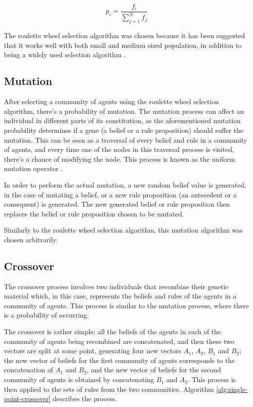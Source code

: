 \begin{equation}
  \label{eq:proportional-fitness}
  p_i = \frac{f_i}{\sum_{j=1}^{N} f_j}
\end{equation}

The roulette wheel selection algorithm was chosen because it has been suggested
that it works well with both small and medium sized population, in addition to
being a widely used selection algorithm \cite{Hancock2012}
\cite{JinghuiZhong2006}. %


\subsection{Mutation}
\label{subsection:mutation}

After selecting a community of agents using the roulette wheel selection
algorithm, there's a probability of mutation. The mutation process can
affect an individual in different parts of its constitution, as the
aforementioned mutation probability determines if a gene (a belief or a rule
proposition) should suffer the mutation. This can be seen as a traversal of
every belief and rule in a community of agents, and every time one of the nodes
in this traversal process is visited, there's a chance of modifying the node.
This process is known as the uniform mutation operator \cite{sivanandam2007introduction}.

In order to perform the actual mutation, a new random belief value is generated,
in the case of mutating a belief, or a new rule proposition (an antecedent or a
consequent) is generated. The new generated belief or rule proposition then
replaces the belief or rule proposition chosen to be mutated.

Similarly to the roulette wheel selection algorithm, this mutation algorithm was
chosen arbitrarily.

\subsection{Crossover}
\label{subsection:crossover}

The crossover process involves two individuals that recombine their genetic
material which, in this case, represents the beliefs and rules of the agents in
a community of agents. This process is similar to the mutation process, where
there is a probability of occurring.

The crossover is rather simple: all the beliefs of the agents in each of the
community of agents being recombined are concatenated, and then these two
vectors are split at some point, generating four new vectors $A_1$, $A_2$, $B_1$
and $B_2$; the new vector of beliefs for the first community of agents
corresponds to the concatenation of $A_1$ and $B_2$, and the new vector of
beliefs for the second community of agents is obtained by concatenating $B_1$
and $A_2$. This process is then applied to the sets of rules from the two
communities. Algorithm \ref{alg:single-point-crossover} describes the process.


